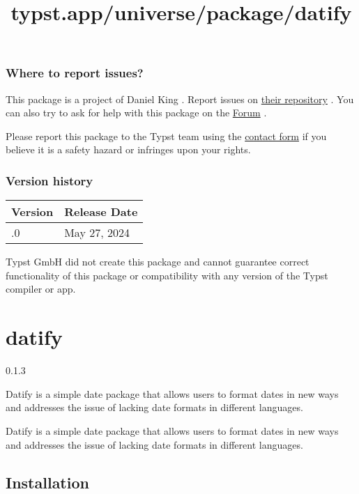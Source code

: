 \subsubsection{Where to report issues?}\label{where-to-report-issues}

This package is a project of Daniel King . Report issues on
\href{https://github.com/dangh3014/postercise/}{their repository} . You
can also try to ask for help with this package on the
\href{https://forum.typst.app}{Forum} .

Please report this package to the Typst team using the
\href{https://typst.app/contact}{contact form} if you believe it is a
safety hazard or infringes upon your rights.

\label{versions}
\subsubsection{Version history}\label{version-history}

\begin{longtable}[]{@{}ll@{}}
\toprule\noalign{}
Version & Release Date \\
\midrule\noalign{}
\endhead
\bottomrule\noalign{}
\endlastfoot
0.1.0 & May 27, 2024 \\
\end{longtable}

Typst GmbH did not create this package and cannot guarantee correct
functionality of this package or compatibility with any version of the
Typst compiler or app.


\title{typst.app/universe/package/datify}

\label{banner}
\section{datify}\label{datify}

{ 0.1.3 }

Datify is a simple date package that allows users to format dates in new
ways and addresses the issue of lacking date formats in different
languages.

\label{readme}
Datify is a simple date package that allows users to format dates in new
ways and addresses the issue of lacking date formats in different
languages.

\subsection{Installation}\label{installation}

